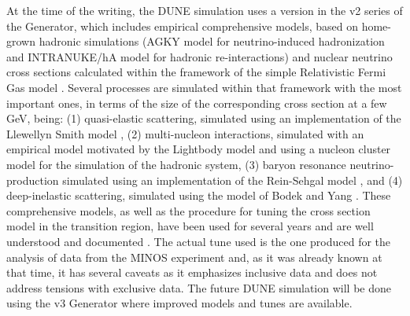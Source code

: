 At the time of the  writing, the DUNE simulation uses a version in the v2 series of the  Generator, which includes empirical comprehensive models, based on home-grown hadronic simulations (AGKY model \cite{Yang:2009zx} for neutrino-induced hadronization and INTRANUKE/hA model \cite{Dytman:2015taa} for hadronic re-interactions) and nuclear neutrino cross sections calculated within the framework of the simple Relativistic Fermi Gas model \cite{Bodek:1981wr}. Several processes are simulated within that framework with the most important ones, in terms of the size of the corresponding cross section at a few GeV, being: (1) quasi-elastic scattering, simulated using an implementation of the Llewellyn Smith model \cite{LlewellynSmith:1971uhs}, (2) multi-nucleon interactions, simulated with an empirical model motivated by the Lightbody model \cite{Lightbody:1988gcu} and using a nucleon cluster model for the simulation of the hadronic system, (3) baryon resonance neutrino-production simulated using an implementation of the Rein-Sehgal model \cite{Rein:1980wg}, and (4) deep-inelastic scattering, simulated using the model of Bodek and Yang \cite{Bodek:2002ps}.  These comprehensive models, as well as the  procedure for tuning the cross section model in the transition region, have been used for several years and are well understood and documented \cite{Andreopoulos:2009rq}. The actual tune used is the one produced for the analysis of data from the MINOS experiment and, as it was already known at that time, it has several caveats as it emphasizes inclusive data and does not address tensions with exclusive data. The future DUNE simulation will be done using the v3  Generator where improved models and tunes are available. %

